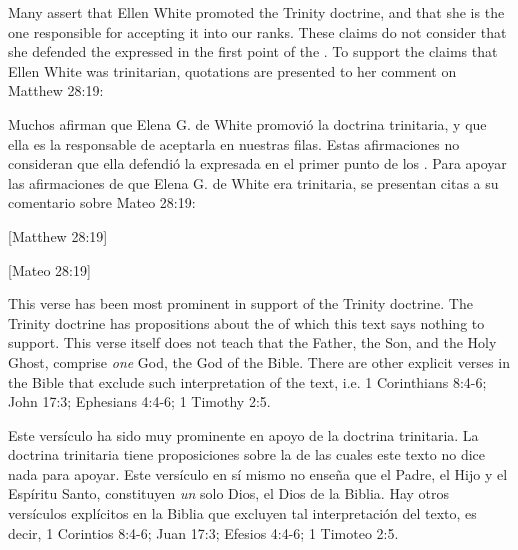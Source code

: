



Many assert that Ellen White promoted the Trinity doctrine, and that she is the one responsible for accepting it into our ranks. These claims do not consider that she defended the  expressed in the first point of the . To support the claims that Ellen White was trinitarian, quotations are presented to her comment on Matthew 28:19:


Muchos afirman que Elena G. de White promovió la doctrina trinitaria, y que ella es la responsable de aceptarla en nuestras filas. Estas afirmaciones no consideran que ella defendió la  expresada en el primer punto de los . Para apoyar las afirmaciones de que Elena G. de White era trinitaria, se presentan citas a su comentario sobre Mateo 28:19:


[Matthew 28:19]


[Mateo 28:19]


This verse has been most prominent in support of the Trinity doctrine. The Trinity doctrine has propositions about the  of which this text says nothing to support. This verse itself does not teach that the Father, the Son, and the Holy Ghost, comprise \textit{one} God, the God of the Bible. There are other explicit verses in the Bible that exclude such interpretation of the text, i.e. 1 Corinthians 8:4-6; John 17:3; Ephesians 4:4-6; 1 Timothy 2:5.


Este versículo ha sido muy prominente en apoyo de la doctrina trinitaria. La doctrina trinitaria tiene proposiciones sobre la  de las cuales este texto no dice nada para apoyar. Este versículo en sí mismo no enseña que el Padre, el Hijo y el Espíritu Santo, constituyen \textit{un} solo Dios, el Dios de la Biblia. Hay otros versículos explícitos en la Biblia que excluyen tal interpretación del texto, es decir, 1 Corintios 8:4-6; Juan 17:3; Efesios 4:4-6; 1 Timoteo 2:5.


